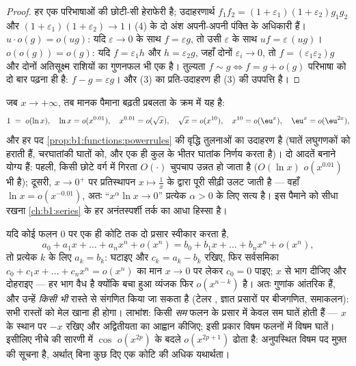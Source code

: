 \begin{proof}
हर एक परिभाषाओं की छोटी-सी हेराफेरी है; उदाहरणार्थ $f_1 f_2 =
(1+\varepsilon_1)(1+\varepsilon_2) g_1 g_2$ और $(1 +
\varepsilon_1)(1+\varepsilon_2) \to 1$। (4) के दो अंश अपनी-अपनी पंक्ति के
अधिकारी हैं। $u\cdot o(g) = o(ug)$: यदि $\varepsilon \to 0$ के साथ $f =
\varepsilon g$, तो उसी $\varepsilon$ के साथ $uf = \varepsilon\,(ug)$।
$o(o(g)) = o(g)$: यदि $f = \varepsilon_1 h$ और $h = \varepsilon_2 g$, जहाँ
दोनों $\varepsilon_i \to 0$, तो $f = (\varepsilon_1\varepsilon_2) g$ और
दोनों अतिसूक्ष्म राशियों का गुणनफल भी एक है। तुल्यता $f \sim g \iff f = g +
o(g)$ परिभाषा को दो बार पढ़ना ही है: $f - g = \varepsilon g$। और (3) का
प्रति-उदाहरण ही (3) की उपपत्ति है।
\end{proof}

\begin{example}[तुलना का पैमाना]\label{ex:b1:taylor:scale}
जब $x \to +\infty$, तब मानक पैमाना बढ़ती प्रबलता के क्रम में यह है:
\[
1 \;=\; o(\ln x), \quad
\ln x = o(x^{0.01}), \quad
x^{0.01} = o(\sqrt x), \quad
\sqrt x = o(x^{10}), \quad
x^{10} = o(\eu^{x}), \quad
\eu^x = o(\eu^{2x}) ,
\]
और हर पद \cref{prop:b1:functions:powerrules} की वृद्धि तुलनाओं का उदाहरण है
(घातें लघुगणकों को हराती हैं, चरघातांकी घातों को, और एक ही कुल के भीतर
घातांक निर्णय करता है)। दो आदतें बनाने योग्य हैं: पहली, किसी छोटे वर्ग में
गिरता $O(\cdot)$ चुपचाप उन्नत हो जाता है ($O(\ln x)$ $o(x^{0.01})$ भी है);
दूसरी, $x \to 0^+$ पर प्रतिस्थापन $x \mapsto \frac1x$ के द्वारा पूरी सीढ़ी
उलट जाती है --- वहाँ $\ln x = o(x^{-0.01})$, अतः ``$x^\alpha \ln x \to 0$''
प्रत्येक $\alpha > 0$ के लिए सत्य है। इस पैमाने को सीधा रखना
\cref{ch:b1:series} के हर अनंतस्पर्शी तर्क का आधा हिस्सा है।
\end{example}

\begin{example}[प्रसारों की अद्वितीयता, और सम-विषमता का लाभांश]\label{ex:b1:taylor:uniqueness}
यदि कोई फलन $0$ पर एक ही कोटि तक दो प्रसार स्वीकार करता है,
\[
a_0 + a_1 x + \dots + a_n x^n + o(x^n)
= b_0 + b_1 x + \dots + b_n x^n + o(x^n),
\]
तो प्रत्येक $k$ के लिए $a_k = b_k$: घटाइए और $c_k = a_k - b_k$ रखिए, फिर
सर्वसमिका $c_0 + c_1 x + \dots + c_n x^n = o(x^n)$ का मान $x \to 0$ पर लेकर
$c_0 = 0$ पाइए; $x$ से भाग दीजिए और दोहराइए --- हर भाग वैध है क्योंकि बचा
हुआ व्यंजक फिर $o(x^{n-k})$ है। अतः गुणांक आंतरिक हैं, और उन्हें \emph{किसी
भी} रास्ते से संगणित किया जा सकता है (टेलर , ज्ञात प्रसारों पर बीजगणित,
समाकलन): सभी रास्तों को मेल खाना ही होगा। लाभांश: किसी \emph{सम} फलन के
प्रसार में केवल सम घातें होती हैं --- $x$ के स्थान पर $-x$ रखिए और
अद्वितीयता का आह्वान कीजिए; इसी प्रकार विषम फलनों में विषम घातें। इसीलिए
नीचे की सारणी में $\cos$ $o(x^{2p})$ के बदले $o(x^{2p+1})$ ढोता है:
अनुपस्थित विषम पद मुफ़्त की सूचना है, अर्थात् बिना कुछ दिए एक कोटि की अधिक
यथार्थता।
\end{example}

